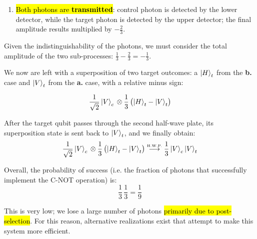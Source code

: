 \begin{itemize}
\begin{itemize}
\begin{enumerate}
    \item \hl{Both photons are \textbf{transmitted}}: control photon is detected by the lower detector, while the target photon is detected by the upper detector; the final amplitude results multiplied by $-\frac{2}{3}$.
\end{enumerate}


Given the indistinguishability of the photons, we must consider the total amplitude of the two sub-processes: $\frac{1}{3}-\frac{2}{3} = -\frac{1}{3}$. 

\end{itemize}

We now are left with a superposition of two target outcomes: a $\ket{H}_t$ from the \textbf{\hspace{0.2ex}b.} case and $\ket{V}_t$ from the \textbf{\hspace{0.2ex}a.} case, with a relative minus sign:

\begin{equation}\label{eqn:17-cnot-case-3-pre-hwp}
\frac{1}{\sqrt{2}}\ket{V}_c\, 
\otimes
\frac{1}{3}\,
\bigl(\ket{H}_t-\ket{V}_t\bigr)
\end{equation}

After the target qubit passes through the second half-wave plate, its superposition state is sent back to $\ket{V}_t$, and we finally obtain:
\begin{equation}
\frac{1}{\sqrt{2}}\ket{V}_c\, 
\otimes
\frac{1}{3}\,
\bigl(\ket{H}_t-\ket{V}_t\bigr)
\stackrel{\text{\tiny{H.W.P.}}}{\longrightarrow}
\frac{1}{3}
\ket{V}_c \ket{V}_t
\end{equation}



Overall, the probability of success (i.e. the fraction of photons that successfully implement the C-NOT operation) is:
\begin{equation}
\frac{1}{3}\, \frac{1}{3} = \frac{1}{9}
\end{equation}

This is very low; we lose a large number of photons \hl{primarily due to post-selection}. For this reason, alternative realizations exist that attempt to make this system more efficient.

\end{itemize}
 
